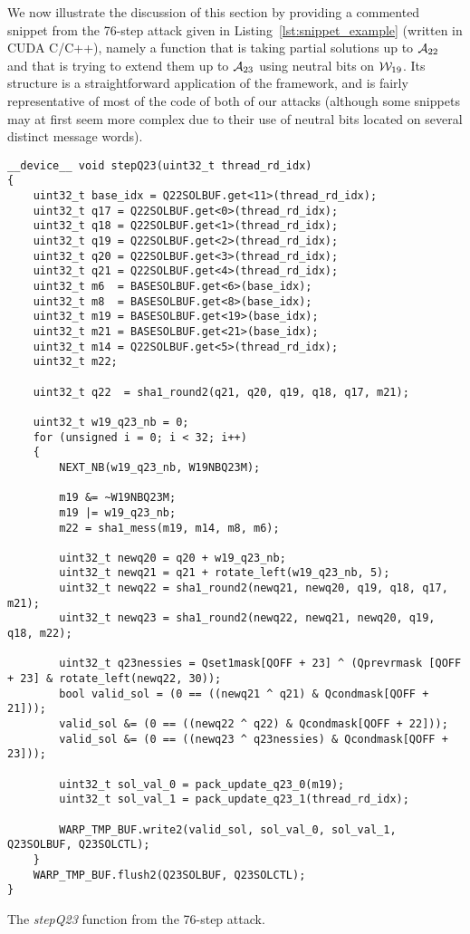 We now illustrate the discussion of this section by providing a commented snippet from the 76-step attack given in Listing~\ref{lst:snippet_example} (written in \textsf{CUDA C/C++}), namely a function that is taking partial solutions up to $\mathcal{A}_{22}$  and that is
trying to extend them up to $\mathcal{A}_{23}$ using neutral bits on $\mathcal{W}_{19}$. Its structure is a straightforward application of the framework, and is fairly representative of most of the
code of both of our attacks (although some snippets may at first seem more complex due to their use of neutral bits located on several distinct message words).

\begin{listing}[tbh]
\begin{center}
\begin{verbatim}
__device__ void stepQ23(uint32_t thread_rd_idx)
{
	uint32_t base_idx = Q22SOLBUF.get<11>(thread_rd_idx);
	uint32_t q17 = Q22SOLBUF.get<0>(thread_rd_idx);
	uint32_t q18 = Q22SOLBUF.get<1>(thread_rd_idx);
	uint32_t q19 = Q22SOLBUF.get<2>(thread_rd_idx);
	uint32_t q20 = Q22SOLBUF.get<3>(thread_rd_idx);
	uint32_t q21 = Q22SOLBUF.get<4>(thread_rd_idx);
	uint32_t m6  = BASESOLBUF.get<6>(base_idx);
	uint32_t m8  = BASESOLBUF.get<8>(base_idx);
	uint32_t m19 = BASESOLBUF.get<19>(base_idx);
	uint32_t m21 = BASESOLBUF.get<21>(base_idx);
	uint32_t m14 = Q22SOLBUF.get<5>(thread_rd_idx);
	uint32_t m22;

	uint32_t q22  = sha1_round2(q21, q20, q19, q18, q17, m21);

	uint32_t w19_q23_nb = 0;
	for (unsigned i = 0; i < 32; i++)
	{
		NEXT_NB(w19_q23_nb, W19NBQ23M);

		m19 &= ~W19NBQ23M;
		m19 |= w19_q23_nb;
		m22 = sha1_mess(m19, m14, m8, m6);

		uint32_t newq20 = q20 + w19_q23_nb;
		uint32_t newq21 = q21 + rotate_left(w19_q23_nb, 5);
		uint32_t newq22 = sha1_round2(newq21, newq20, q19, q18, q17, m21);
		uint32_t newq23 = sha1_round2(newq22, newq21, newq20, q19, q18, m22);

		uint32_t q23nessies = Qset1mask[QOFF + 23] ^ (Qprevrmask [QOFF + 23] & rotate_left(newq22, 30));
		bool valid_sol = (0 == ((newq21 ^ q21) & Qcondmask[QOFF + 21]));
		valid_sol &= (0 == ((newq22 ^ q22) & Qcondmask[QOFF + 22]));
		valid_sol &= (0 == ((newq23 ^ q23nessies) & Qcondmask[QOFF + 23]));

		uint32_t sol_val_0 = pack_update_q23_0(m19);
		uint32_t sol_val_1 = pack_update_q23_1(thread_rd_idx);

		WARP_TMP_BUF.write2(valid_sol, sol_val_0, sol_val_1, Q23SOLBUF, Q23SOLCTL);
	}
	WARP_TMP_BUF.flush2(Q23SOLBUF, Q23SOLCTL);
}
\end{verbatim}
\end{center}
\caption{The \emph{stepQ23} function from the 76-step attack.}
\label{lst:snippet_example}
\end{listing}

